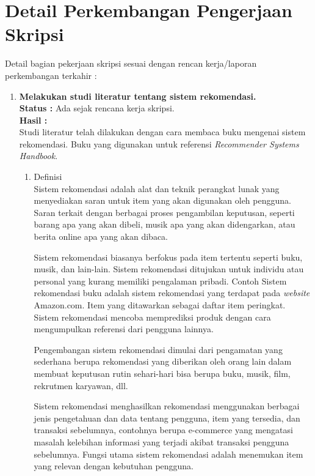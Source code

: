 \documentclass[a4paper,twoside]{article}
\begin{document}
\section{Detail Perkembangan Pengerjaan Skripsi}
Detail bagian pekerjaan skripsi sesuai dengan rencan kerja/laporan perkembangan terkahir :
	\begin{enumerate}
		\item \textbf{Melakukan studi literatur tentang sistem rekomendasi.}\\
		{\bf Status :} Ada sejak rencana kerja skripsi.\\
		{\bf Hasil :}\\
		Studi literatur telah dilakukan dengan cara membaca buku mengenai sistem rekomendasi. Buku yang digunakan untuk referensi \textit{Recommender Systems Handbook}.
		 
		\begin{enumerate}
			\item Definisi\\
				Sistem rekomendasi adalah alat dan teknik perangkat lunak yang menyediakan saran untuk item yang akan digunakan oleh pengguna. Saran terkait dengan berbagai proses pengambilan keputusan, seperti barang apa yang akan dibeli, musik apa yang akan didengarkan, atau berita online apa yang akan dibaca. %

				Sistem rekomendasi biasanya berfokus pada item tertentu seperti buku, musik, dan lain-lain. Sistem rekomendasi ditujukan untuk individu atau personal yang kurang memiliki pengalaman pribadi. Contoh Sistem rekomendasi buku adalah sistem rekomendasi yang terdapat pada \textit{website} Amazon.com. Item yang ditawarkan sebagai daftar item peringkat. Sistem rekomendasi mencoba memprediksi produk dengan cara mengumpulkan referensi dari pengguna lainnya. %

				Pengembangan sistem rekomendasi dimulai dari pengamatan yang sederhana berupa rekomendasi yang diberikan oleh orang lain dalam membuat keputusan rutin sehari-hari bisa berupa buku, musik, film, rekrutmen karyawan, dll. %

				Sistem rekomendasi menghasilkan rekomendasi menggunakan berbagai jenis pengetahuan dan data tentang pengguna, item yang tersedia, dan transaksi sebelumnya, contohnya berupa e-commerce yang mengatasi masalah kelebihan informasi yang terjadi akibat transaksi pengguna sebelumnya. %
				Fungsi utama sistem rekomendasi adalah menemukan item yang relevan dengan kebutuhan pengguna.
				

\end{enumerate}
\end{enumerate}
\end{document}
